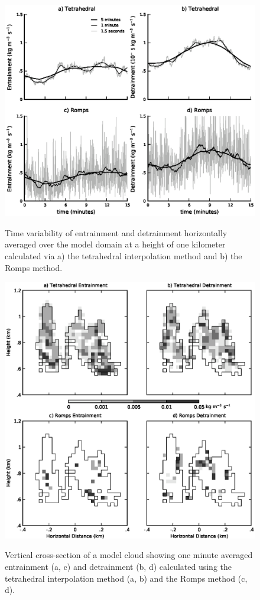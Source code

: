 \documentclass[12pt]{article}
\begin{document}
\begin{figure}[t]
  \noindent
  \includegraphics[width=39pc,angle=0]{./figures/averaging_convergence}\\ 
  \caption{Time variability of entrainment and detrainment horizontally 
  averaged over the model domain at a height of one kilometer calculated via 
  a) the tetrahedral interpolation method and b) the Romps method.
  }
  \label{fig:averaging_convergence}
\end{figure}

\begin{figure}[t]
  \noindent\includegraphics[width=39pc,angle=0]{./figures/spatial_variability_1min}\\ 
  \caption{Vertical cross-section of a model cloud showing one minute averaged 
  entrainment (a, c) and detrainment (b, d) calculated using the tetrahedral 
  interpolation method (a, b) and the Romps method (c, d).
  }
  \label{fig:spatial_variability}
\end{figure}
\end{document}
